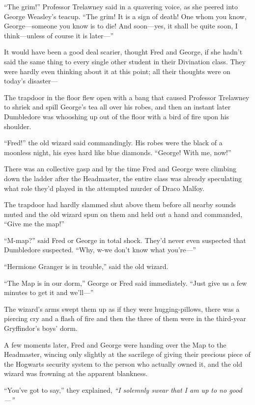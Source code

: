 ``The grim!'' Professor Trelawney said in a quavering voice, as she
peered into George Weasley's teacup. ``The grim! It is a sign of death!
One whom you know, George---someone you know is to die! And soon---yes,
it shall be quite soon, I think---unless of course it is later---''

It would have been a good deal scarier, thought Fred and George, if she
hadn't said the same thing to every single other student in their
Divination class. They were hardly even thinking about it at this point;
all their thoughts were on today's disaster---

The trapdoor in the floor flew open with a bang that caused Professor
Trelawney to shriek and spill George's tea all over his robes, and then
an instant later Dumbledore was whooshing up out of the floor with a
bird of fire upon his shoulder.

``Fred!'' the old wizard said commandingly. His robes were the black of
a moonless night, his eyes hard like blue diamonds. ``George! With me,
now!''

There was an collective gasp and by the time Fred and George were
climbing down the ladder after the Headmaster, the entire class was
already speculating what role they'd played in the attempted murder of
Draco Malfoy.

The trapdoor had hardly slammed shut above them before all nearby sounds
muted and the old wizard spun on them and held out a hand and commanded,
``Give me the map!''

``M-map?'' said Fred or George in total shock. They'd never even
suspected that Dumbledore suspected. ``Why, w-we don't know what
you're---''

``Hermione Granger is in trouble,'' said the old wizard.

``The Map is in our dorm,'' George or Fred said immediately. ``Just give
us a few minutes to get it and we'll---''

The wizard's arms swept them up as if they were hugging-pillows, there
was a piercing cry and a flash of fire and then the three of them were
in the third-year Gryffindor's boys' dorm.

A few moments later, Fred and George were handing over the Map to the
Headmaster, wincing only slightly at the sacrilege of giving their
precious piece of the Hogwarts security system to the person who
actually owned it, and the old wizard was frowning at the apparent
blankness.

``You've got to say,'' they explained, \emph{``I solemnly swear that I
am up to no good---''}


